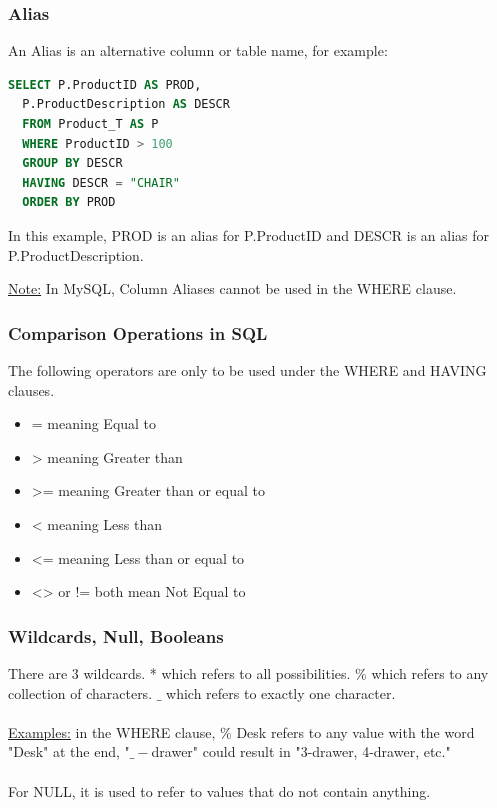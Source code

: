 \documentclass[12pt]{article}
\begin{document}
\subsubsection{Alias}

An Alias is an alternative column or table name, for example:\\

\begin{lstlisting}[language=SQL]
SELECT P.ProductID AS PROD,
  P.ProductDescription AS DESCR
  FROM Product_T AS P
  WHERE ProductID > 100
  GROUP BY DESCR
  HAVING DESCR = "CHAIR"
  ORDER BY PROD

\end{lstlisting}

In this example, PROD is an alias for P.ProductID and DESCR is an alias for 
P.ProductDescription.

\begin{tcolorbox}
	\underline{Note:} In MySQL, Column Aliases cannot be used in the WHERE clause.
\end{tcolorbox}

\subsubsection{Comparison Operations in SQL}

The following operators are only to be used under the WHERE and HAVING clauses.

\begin{itemize}
	\item{= meaning Equal to}
	\item{>  meaning Greater than}
	\item{>= meaning Greater than or equal to}
	\item{<  meaning Less than}
	\item{<= meaning Less than or equal to}
	\item{<> or != both mean Not Equal to}
\end{itemize}

\subsubsection{Wildcards, Null, Booleans}

There are 3 wildcards. * which refers to all possibilities. \% which refers to any collection of characters. $\_$ which refers to exactly one character.\\
\\
\underline{Examples:} in the WHERE clause, \% Desk refers to any value with the word "Desk" at the end, "$\_-$drawer" could result in "3-drawer, 4-drawer, etc."\\
\\
For NULL, it is used to refer to values that do not contain anything.
\end{document}

